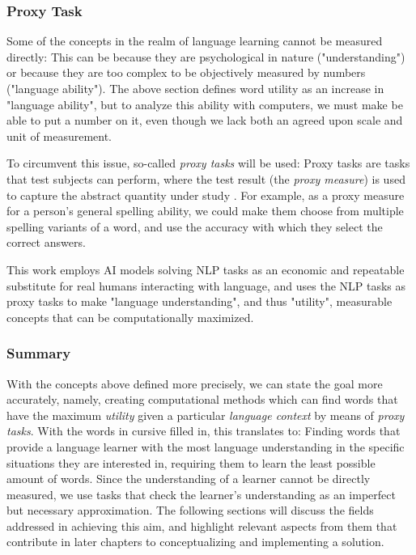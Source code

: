 \subsubsection{Proxy Task}
Some of the concepts in the realm of language learning cannot be measured directly:
This can be because they are psychological in nature ("understanding") or because they are too complex to be objectively measured by numbers ("language ability").
The above section defines word utility as an increase in "language ability", but to analyze this ability with computers, we must make be able to put a number on it, even though we lack both an agreed upon scale and unit of measurement.

To circumvent this issue, so-called \textit{proxy tasks} will be used:
Proxy tasks are tasks that test subjects can perform, where the test result (the \textit{proxy measure}) is used to capture the abstract quantity under study .
For example, as a proxy measure for a person's general spelling ability, we could make them choose from multiple spelling variants of a word, and use the accuracy with which they select the correct answers.

This work employs AI models solving NLP tasks as an economic and repeatable substitute for real humans interacting with language, and uses the NLP tasks as proxy tasks to make "language understanding", and thus "utility", measurable concepts that can be computationally maximized.

\subsubsection{Summary}
With the concepts above defined more precisely, we can state the goal more accurately, namely, creating computational methods which can find words that have the maximum \textit{utility} given a particular \textit{language context} by means of \textit{proxy tasks}.
With the words in cursive filled in, this translates to:
Finding words that provide a language learner with the most language understanding in the specific situations they are interested in, requiring them to learn the least possible amount of words.
Since the understanding of a learner cannot be directly measured, we use tasks that check the learner's understanding as an imperfect but necessary approximation.
The following sections will discuss the fields addressed in achieving this aim, and highlight relevant aspects from them that contribute in later chapters to conceptualizing and implementing a solution.


